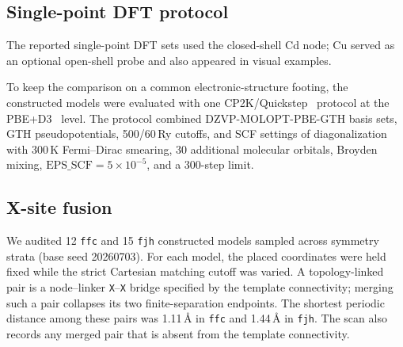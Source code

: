 \documentclass[a5paper, 10pt]{article}
\begin{document}
\subsection{Single-point DFT protocol}
\label{app:dft_screening}

The reported single-point DFT sets used the closed-shell Cd node; Cu served as an optional open-shell probe and also appeared in visual examples.

To keep the comparison on a common electronic-structure footing, the constructed models were evaluated with one CP2K/Quickstep~\cite{cp2k2020} protocol at the PBE+D3~\cite{perdew1996pbe,grimme2010d3} level. The protocol combined DZVP-MOLOPT-PBE-GTH basis sets, GTH pseudopotentials, 500/60\,Ry cutoffs, and SCF settings of diagonalization with 300\,K Fermi--Dirac smearing, 30 additional molecular orbitals, Broyden mixing, $\mathrm{EPS\_SCF}=5\times10^{-5}$, and a 300-step limit.

\subsection{X-site fusion}
\label{app:x_fusion}

We audited 12 \texttt{ffc} and 15 \texttt{fjh} constructed models sampled across symmetry strata (base seed 20260703). For each model, the placed coordinates were held fixed while the strict Cartesian matching cutoff was varied. A topology-linked pair is a node--linker \texttt{X}--\texttt{X} bridge specified by the template connectivity; merging such a pair collapses its two finite-separation endpoints. The shortest periodic distance among these pairs was 1.11\,\AA{} in \texttt{ffc} and 1.44\,\AA{} in \texttt{fjh}. The scan also records any merged pair that is absent from the template connectivity.
\end{document}
